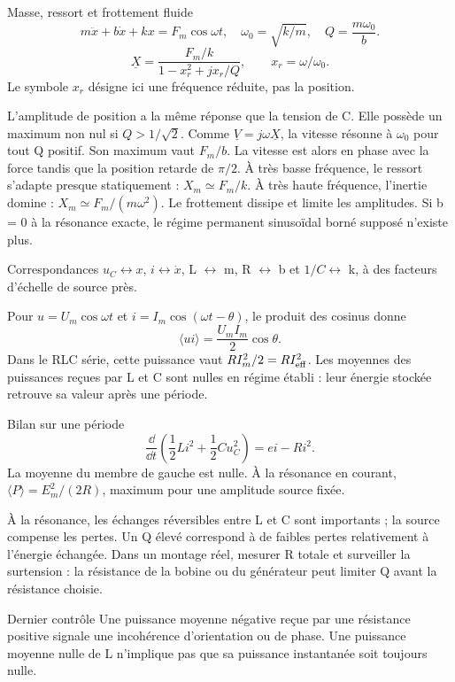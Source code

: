 \begin{loi}{Masse, ressort et frottement fluide}
\[m\ddot x+b\dot x+kx=F_m\cos\omega t,\quad \omega_0=\sqrt{k/m},\quad Q=\frac{m\omega_0}{b}.\]\[\underline X=\frac{F_m/k}{1-x_r^2+jx_r/Q},\qquad x_r=\omega/\omega_0.\]Le symbole $x_r$ désigne ici une fréquence réduite, pas la position.
\end{loi}
L’amplitude de position a la même réponse que la tension de C. Elle possède un maximum non nul si $Q>1/\sqrt2$. Comme $\underline V=j\omega\underline X$, la vitesse résonne à $\omega_0$ pour tout Q positif. Son maximum vaut $F_m/b$. La vitesse est alors en phase avec la force tandis que la position retarde de $\pi/2$.
À très basse fréquence, le ressort s’adapte presque statiquement : $X_m\simeq F_m/k$. À très haute fréquence, l’inertie domine : $X_m\simeq F_m/(m\omega^2)$. Le frottement dissipe et limite les amplitudes. Si b = 0 à la résonance exacte, le régime permanent sinusoïdal borné supposé n’existe plus.
\begin{docu}{Correspondances}
$u_C\leftrightarrow x$, $i\leftrightarrow\dot x$, L $\leftrightarrow$ m, R $\leftrightarrow$ b et $1/C\leftrightarrow$ k, à des facteurs d’échelle de source près.
\end{docu}


Pour $u=U_m\cos\omega t$ et $i=I_m\cos(\omega t-\theta)$, le produit des cosinus donne\[\langle ui\rangle=\frac{U_m I_m}2\cos\theta.\]Dans le RLC série, cette puissance vaut $RI_m^2/2=RI_{\rm eff}^2$. Les moyennes des puissances reçues par L et C sont nulles en régime établi : leur énergie stockée retrouve sa valeur après une période.
\begin{loi}{Bilan sur une période}
\[\frac{\dd}{\dd t}\left(\frac12Li^2+\frac12Cu_C^2\right)=ei-Ri^2.\]La moyenne du membre de gauche est nulle. À la résonance en courant, $\langle P\rangle=E_m^2/(2R)$, maximum pour une amplitude source fixée.
\end{loi}
À la résonance, les échanges réversibles entre L et C sont importants ; la source compense les pertes. Un Q élevé correspond à de faibles pertes relativement à l’énergie échangée. Dans un montage réel, mesurer R totale et surveiller la surtension : la résistance de la bobine ou du générateur peut limiter Q avant la résistance choisie.
\begin{methode}{Dernier contrôle}
Une puissance moyenne négative reçue par une résistance positive signale une incohérence d’orientation ou de phase. Une puissance moyenne nulle de L n’implique pas que sa puissance instantanée soit toujours nulle.
\end{methode}


